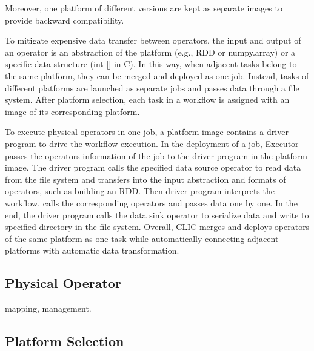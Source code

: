 Moreover, one platform of different versions are kept as separate images to provide backward compatibility.

To mitigate expensive data transfer between operators, the input and output of an operator is an abstraction of the platform (e.g., RDD or numpy.array) or a specific data structure (int [] in C).
In this way, when adjacent tasks belong to the same platform, they can be merged and deployed as one job.
Instead, tasks of different platforms are launched as separate jobs and passes data through a file system.
After platform selection, each task in a workflow is assigned with an image of its corresponding platform.

To execute physical operators in one job, a platform image contains a driver program to drive the workflow execution. 
In the deployment of a job, Executor passes the operators information of the job to the driver program in the platform image. 
The driver program calls the specified data source operator to read data from the file system and transfers into the input abstraction and formats of operators, such as building an RDD. Then driver program interprets the workflow, calls the corresponding operators and passes data one by one. In the end, the driver program calls the data sink operator to serialize data and write to specified directory in the file system.
Overall, CLIC merges and deploys operators of the same platform as one task while automatically connecting adjacent platforms with automatic data transformation. 




\subsection{Physical Operator}
mapping, management.

\subsection{Platform Selection}


